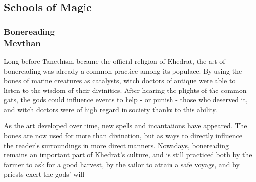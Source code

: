 
\subsection*{Schools of Magic}
\begin{linenumbers}

\subsubsection{Bonereading\\ \small{Mevthan}}
Long before Tanethism became the official religion of Khedrat, the art of bonereading was already a common practice among its populace.
By using the bones of marine creatures as catalysts, witch doctors of antique were able to listen to the wisdom of their divinities.
After hearing the plights of the common gats, the gods could influence events to help - or punish - those who deserved it, and witch doctors were of high regard in society thanks to this ability.

As the art developed over time, new spells and incantations have appeared.
The bones are now used for more than divination, but as ways to directly influence the reader's surroundings in more direct manners.
Nowadays, bonereading remains an important part of Khedrat's culture, and is still practiced both by the farmer to ask for a good harvest, by the sailor to attain a safe voyage, and by priests exert the gods' will.


\end{linenumbers}
